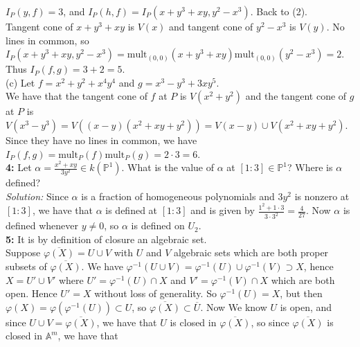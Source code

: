 \documentclass[a4paper]{article}
\begin{document}
    $I_P(y,f) = 3$, and
    $I_P(h,f) = I_P(x+y^3 + xy, y^2 - x^3)$. Back to (2).\\
    Tangent cone of $x+y^3 + xy$ is $V(x)$ and tangent cone of
    $y^2 - x^3$ is $V(y)$. No lines in common, so
    $I_P(x+y^3 + xy, y^2 - x^3) = \text{mult}_{(0,0)}(x+y^3 + xy)
    \text{mult}_{(0,0)}(y^2 - x^3) = 2$. Thus
    $I_P(f,g) = 3+2 = 5$.\\
    \linebreak
    (c) Let $f = x^2 + y^2 + x^{4}y^{4}$ and $g = x^3 - y^3 + 3xy^{5}$.\\
    We have that the tangent cone of $f$ at $P$ is
    $V(x^2 + y^2)$ and the tangent cone of $g$ at $P$ is
    $V(x^3 - y^3) = V((x-y)(x^2 + xy + y^2)) = V(x-y) \cup V(x^2 + xy + y^2)$.
    Since they have no lines in common, we have
    $I_P(f,g) = \text{mult}_P(f) \text{mult}_P(g) = 
    2 \cdot  3 = 6$.\\
    \linebreak
    \textbf{4:} Let $\alpha = \frac{x^2 + xy}{3y^2} \in k(\mathbb{P}^{1})$.
    What is the value of $\alpha$ at $\left[ 1:3 \right] \in \mathbb{P}^{1}$?
    Where is $\alpha$ defined?\\
    \linebreak
    \textit{Solution:} Since $\alpha$ is a fraction of
    homogeneous polynomials and $3y^2$ is nonzero at
    $\left[ 1:3 \right] $, we have that $\alpha$ is defined at
    $\left[ 1:3 \right] $ and is given by
    $\frac{1^2 + 1 \cdot 3}{3 \cdot 3^2}= \frac{4}{27}$. Now  $\alpha$ is
    defined whenever $y\neq 0$, so
    $\alpha$ is defined on $U_2$.\\
    \linebreak
    \textbf{5:} It is by definition of closure an algebraic set.\\
    Suppose $\overline{\varphi(X)} =
    U \cup V$ with $U$ and $V$ algebraic sets which are both proper subsets
    of $\overline{\varphi(X)}$. We have
    $\varphi^{-1}(U \cup V) = \varphi^{-1}(U) \cup \varphi^{-1}(V) \supset X$,
    hence $X = U' \cup V'$ where $U' = \varphi^{-1}(U) \cap X$ and
    $V' = \varphi^{-1}(V) \cap X$ which are both open. Hence
    $U' = X$ without loss of generality. So
    $\varphi^{-1}(U) = X$, but then
    $\varphi(X) = \varphi\left( \varphi^{-1}(U) \right) 
    \subset U$, so $\overline{\varphi(X)} 
    \subset \overline{U}$. Now
    We know $U$ is open, and since $U \cup V = \overline{\varphi(X)}$, we have
    that $U$ is closed in $\overline{\varphi(X)}$, so since
    $\overline{\varphi(X)}$ is closed in $\mathbb{A}^{m}$, we have that
\end{document}
